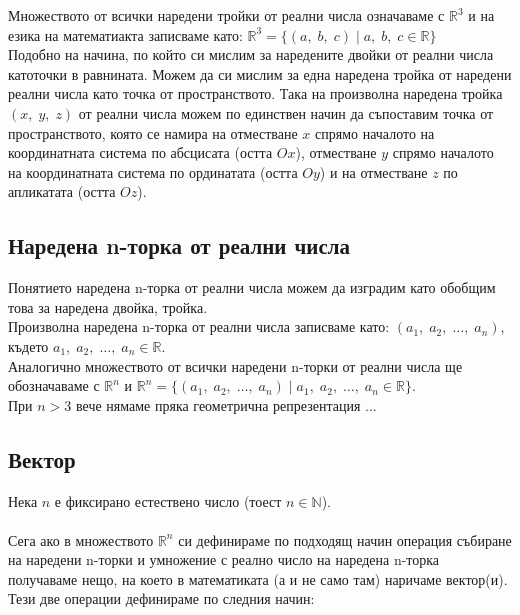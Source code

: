 \documentclass[12pt]{article}
\newcommand{\N}{\mathbb{N}}
\newcommand{\R}{\mathbb{R}}
\begin{document}
Множеството от всички наредени тройки от реални числа означаваме с $\R^3$ и на езика на математиакта записваме като:
$\R^3 = \{(a, \; b, \; c) \; | \; a, \; b, \; c \in \R\}$ \\
  
Подобно на начина, по който си мислим за наредените двойки от реални числа катоточки в равнината.
Можем да си мислим за една наредена тройка от наредени реални числа като точка от пространството.
Така на произволна наредена тройка $(x, \; y, \; z)$ от реални числа можем по единствен начин да съпоставим
точка от пространството, която се намира на отместване $x$ спрямо началото на координатната система по абсцисата (остта $Ox$),
отместване $y$ спрямо началото на координатната система по ординатата (остта $Oy$) и на отместване $z$ по апликатата (остта $Oz$).

\subsection*{Наредена n-торка от реални числа}

Понятието наредена n-торка от реални числа можем да изградим като обобщим това за наредена двойка, тройка. \\

Произволна наредена n-торка от реални числа записваме като: $(a_1, \; a_2, \; \dots, \; a_n)$, където $a_1, \; a_2, \; \dots, \; a_n \in \R$. \\

Аналогично множеството от всички наредени n-торки от реални числа ще обозначаваме с $\R^n$ и
$\R^n = \{(a_1, \; a_2, \; \dots, \; a_n) \; | \; a_1, \; a_2, \; \dots, \; a_n \in \R\}$. \\

При $n > 3$ вече нямаме пряка геометрична репрезентация ... \\

\subsection*{Вектор}

Нека $n$ е фиксирано естествено число (тоест $n \in \N$). \\\\

Сега ако в множеството $\R^n$ си дефинираме по подходящ начин операция събиране на наредени n-торки и умножение с реално число на наредена n-торка получаваме нещо, на което в математиката (а и не само там)
наричаме вектор(и). Тези две операции дефинираме по следния начин: \\
\end{document}
